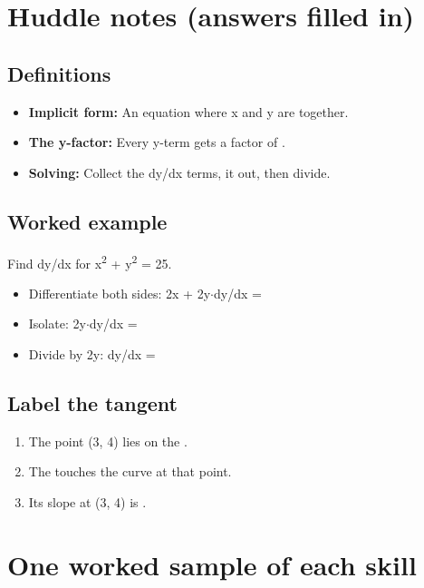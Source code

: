 \documentclass[11pt]{article}
\begin{document}
\section*{Huddle notes (answers filled in)}
\subsection*{Definitions}\begin{itemize}
\item \textbf{Implicit form:} An equation where x and y are  together.
\item \textbf{The y-factor:} Every y-term gets a factor of .
\item \textbf{Solving:} Collect the dy/dx terms,  it out, then divide.
\end{itemize}
\subsection*{Worked example}
Find dy/dx for x\textsuperscript{2} + y\textsuperscript{2} = 25.\\
\begin{itemize}
\item Differentiate both sides: 2x + 2y$\cdot$dy/dx = 
\item Isolate: 2y$\cdot$dy/dx = 
\item Divide by 2y: dy/dx = 
\end{itemize}
\subsection*{Label the tangent}
\begin{enumerate}
\item The point (3, 4) lies on the .
\item The  touches the curve at that point.
\item Its slope at (3, 4) is .
\end{enumerate}
\section*{One worked sample of each skill}
\end{document}

